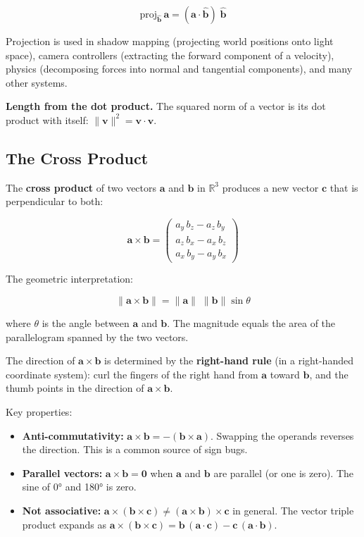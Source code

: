 \documentclass[
  11pt,
  letterpaper,
  DIV=11,
  numbers=noendperiod,
  twoside,
  open=right]{scrreprt}
\providecommand{\tightlist}{%
  \setlength{\itemsep}{0pt}\setlength{\parskip}{0pt}}
\begin{document}
\[
\text{proj}_{\hat{\mathbf{b}}} \, \mathbf{a} = (\mathbf{a} \cdot \hat{\mathbf{b}}) \; \hat{\mathbf{b}}
\]

Projection is used in shadow mapping (projecting world positions onto
light space), camera controllers (extracting the forward component of a
velocity), physics (decomposing forces into normal and tangential
components), and many other systems.

\textbf{Length from the dot product.} The squared norm of a vector is
its dot product with itself:
\(\|\mathbf{v}\|^2 = \mathbf{v} \cdot \mathbf{v}\).

\subsection{The Cross Product}\label{the-cross-product}

The \textbf{cross product} of two vectors \(\mathbf{a}\) and
\(\mathbf{b}\) in \(\mathbb{R}^3\) produces a new vector \(\mathbf{c}\)
that is perpendicular to both:

\[
\mathbf{a} \times \mathbf{b} = \begin{pmatrix}
  a_y \, b_z - a_z \, b_y \\
  a_z \, b_x - a_x \, b_z \\
  a_x \, b_y - a_y \, b_x
\end{pmatrix}
\]

The geometric interpretation:

\[
\|\mathbf{a} \times \mathbf{b}\| = \|\mathbf{a}\| \; \|\mathbf{b}\| \sin\theta
\]

where \(\theta\) is the angle between \(\mathbf{a}\) and \(\mathbf{b}\).
The magnitude equals the area of the parallelogram spanned by the two
vectors.

The direction of \(\mathbf{a} \times \mathbf{b}\) is determined by the
\textbf{right-hand rule} (in a right-handed coordinate system): curl the
fingers of the right hand from \(\mathbf{a}\) toward \(\mathbf{b}\), and
the thumb points in the direction of \(\mathbf{a} \times \mathbf{b}\).

Key properties:

\begin{itemize}
\tightlist
\item
  \textbf{Anti-commutativity:}
  \(\mathbf{a} \times \mathbf{b} = -(\mathbf{b} \times \mathbf{a})\).
  Swapping the operands reverses the direction. This is a common source
  of sign bugs.
\item
  \textbf{Parallel vectors:}
  \(\mathbf{a} \times \mathbf{b} = \mathbf{0}\) when \(\mathbf{a}\) and
  \(\mathbf{b}\) are parallel (or one is zero). The sine of 0° and 180°
  is zero.
\item
  \textbf{Not associative:}
  \(\mathbf{a} \times (\mathbf{b} \times \mathbf{c}) \neq (\mathbf{a} \times \mathbf{b}) \times \mathbf{c}\)
  in general. The vector triple product expands as
  \(\mathbf{a} \times (\mathbf{b} \times \mathbf{c}) = \mathbf{b} \, (\mathbf{a} \cdot \mathbf{c}) - \mathbf{c} \, (\mathbf{a} \cdot \mathbf{b})\).
\end{itemize}
\end{document}
